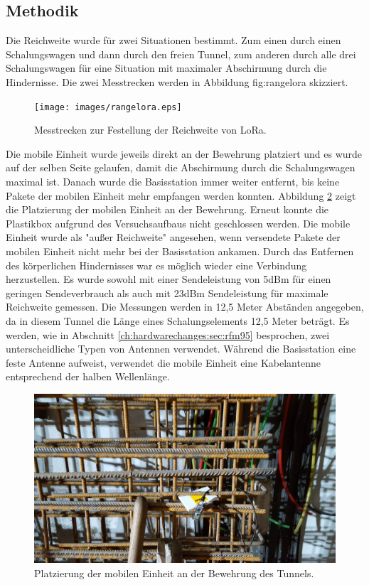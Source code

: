 \subsection{Methodik} 
Die Reichweite wurde für zwei Situationen bestimmt.
Zum einen durch einen Schalungswagen und dann durch den freien Tunnel, zum anderen durch alle drei Schalungswagen für eine Situation mit maximaler Abschirmung durch die Hindernisse.
Die zwei Messtrecken werden in Abbildung {fig:rangelora} skizziert.

\begin{figure}[h!]
  \centering
	\texttt{[image: images/rangelora.eps]}
  \caption{Messtrecken zur Festellung der Reichweite von LoRa.}
  \label{fig:rangelora}
\end{figure}

Die mobile Einheit wurde jeweils direkt an der Bewehrung platziert und es wurde auf der selben Seite gelaufen, damit die Abschirmung durch die Schalungswagen maximal ist.
Danach wurde die Basisstation immer weiter entfernt, bis keine Pakete der mobilen Einheit mehr empfangen werden konnten.
Abbildung \ref{fig:lorabasis} zeigt die Platzierung der mobilen Einheit an der Bewehrung.
Erneut konnte die Plastikbox aufgrund des Versuchsaufbaus nicht geschlossen werden.
Die mobile Einheit wurde als "{}außer Reichweite"{} angesehen, wenn versendete Pakete der mobilen Einheit nicht mehr bei der Basisstation ankamen.
Durch das Entfernen des körperlichen Hindernisses war es möglich wieder eine Verbindung herzustellen.
Es wurde sowohl mit einer Sendeleistung von 5dBm für einen geringen Sendeverbrauch als auch mit 23dBm Sendeleistung für maximale Reichweite gemessen.
Die Messungen werden in 12,5 Meter Abständen angegeben, da in diesem Tunnel die Länge eines Schalungselements 12,5 Meter beträgt.
Es werden, wie in Abschnitt \ref{ch:hardwarechanges:sec:rfm95} besprochen, zwei unterscheidliche Typen von Antennen verwendet. 
Während die Basisstation eine feste Antenne aufweist, verwendet die mobile Einheit eine Kabelantenne entsprechend der halben Wellenlänge. 

\begin{figure}[h]
  \centering
	\includegraphics[width=\textwidth]{images/lorabasis.jpg}
  \caption{Platzierung der mobilen Einheit an der Bewehrung des Tunnels.}
  \label{fig:lorabasis}
\end{figure}

